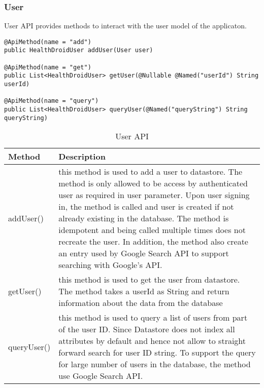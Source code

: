 \subsubsection{User}
User API provides methods to interact with the user model of the applicaton.
\begin{minipage}{\linewidth}
\begin{lstlisting}
@ApiMethod(name = "add")
public HealthDroidUser addUser(User user)

@ApiMethod(name = "get")
public List<HealthDroidUser> getUser(@Nullable @Named("userId") String userId)

@ApiMethod(name = "query")
public List<HealthDroidUser> queryUser(@Named("queryString") String queryString)
\end{lstlisting}
\end{minipage}

\begin{table}[h]
\begin{center}
    \begin{tabular}{| l | p{12cm} |}
        \hline Method & Description \\
        \hline addUser() & 
            this method is used to add a user to datastore. The method is only allowed to be access by
            authenticated user as required in user parameter. Upon user signing in, the method is called and user is
            created if not already existing in the database. The method is idempotent and being called multiple times
            does not recreate the user. In addition, the method also create an entry used by Google Search API to
            support searching with Google's API.  \\
        \hline getUser() &
            this method is used to get the user from datastore. The method takes a userId as String and return
            information about the data from the database \\
        \hline queryUser() &
            this method is used to query a list of users from part of the user ID. Since Datastore does not index all
            attributes by default and hence not allow to straight forward search for user ID string. To support the
            query for large number of users in the database, the method use Google Search API. \\
        \hline
    \end{tabular}
    \caption{User API}
\end{center}
\end{table}

